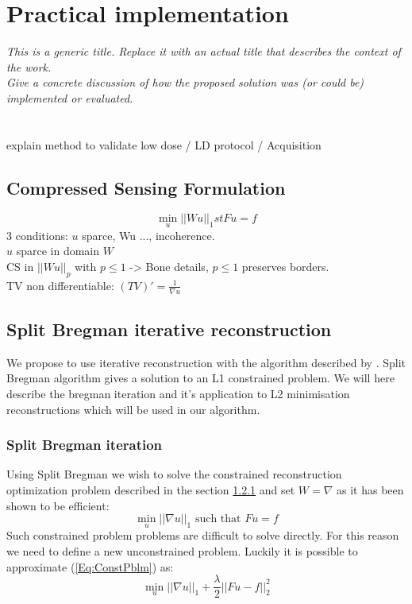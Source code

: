 \chapter{Practical implementation }
\textit{This is a generic title. Replace it with an actual title that describes the context of the work.\\
Give a concrete discussion of how the proposed solution was (or could be) implemented or evaluated.}\\
\\
\\

explain method to validate low dose / LD protocol / Acquisition
\section{Compressed Sensing Formulation}

$$
\min_u ||Wu||_1 st Fu = f
$$
3 conditions: $u$ sparce, Wu ..., incoherence.\\
$u$ sparce in domain $W$\\
CS in $||Wu||_p$ with $p\leq 1$ -> Bone details, $p\leq 1$ preserves borders.\\
TV non differentiable: $(TV)' = \frac{1}{\nabla u}$

\section{Split Bregman iterative reconstruction}
We propose to use iterative reconstruction with the algorithm described by \cite{goldstein2009split}. Split Bregman algorithm gives a solution to an L1 constrained problem. We will here describe the bregman iteration and it's application to L2 minimisation reconstructions which will be used in our algorithm.
    \subsection{Split Bregman iteration}
    Using Split Bregman we wish to solve the constrained reconstruction optimization problem described in the section \ref{} and set $W = \nabla$ as it has been shown to be efficient:
    \begin{equation}
        \min\limits_{u}||\nabla u||_1 \mbox{ such that } Fu=f
        \label{Eq:ConstPblm}
    \end{equation}
 Such constrained problem problems are difficult to solve directly. For this reason we need to define a new unconstrained problem. Luckily it is possible to approximate (\ref{Eq:ConstPblm}) as:
    \begin{equation}
        \min_{u}||\nabla u||_1 + \frac{\lambda}{2}||Fu-f||_2^2
    \end{equation}
    
